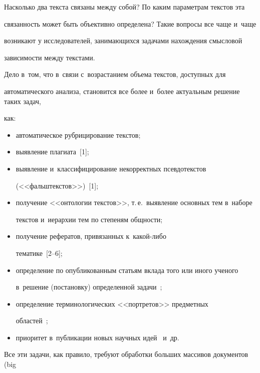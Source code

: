      Насколько два текста связаны между собой? По каким параметрам текстов эта 

связанность может быть объективно определена? Такие вопросы все чаще и~чаще 

возникают у исследователей, занимающихся задачами нахождения смысловой 

зависимости между текстами. 

     

     Дело в~том, что в~связи с~возрастанием объема текстов, доступных для 

автоматического анализа, становится все более и~более актуальным решение таких задач, 

как:

     \begin{itemize}

     \item  автоматическое рубрицирование текстов; 

     \item выявление плагиата~[1];

     \item выявление и~классифицирование некорректных псевдотекстов 

(<<фальштекстов>>)~[1];

     \item получение <<онтологии текстов>>, т.\,е.\ выявление основных тем в~наборе 

текстов и~иерархии тем по степеням общности;

     \item получение рефератов, привязанных к~ка\-кой-ли\-бо  

тематике~[2--6];

     \item определение по опубликованным статьям вклада того или иного ученого 

в~решение (постановку) определенной задачи~\cite{8-sha};

     \item определение терминологических <<портретов>> предметных  

областей~\cite{2-sha};

     \item приоритет в~публикации новых научных идей~\cite{8-sha} и~др.

     \end{itemize}

     

     Все эти задачи, как правило, требуют обработки больших массивов документов (big 

